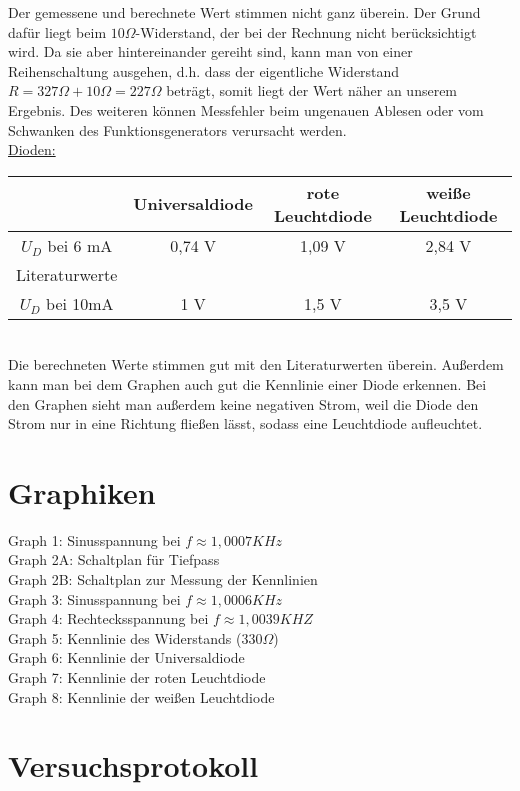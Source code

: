 \documentclass[paper=a4, fontsize=11pt]{scrartcl}
\numberwithin{equation}{section}
\numberwithin{figure}{section}
\numberwithin{table}{section}
\begin{document}
Der gemessene und berechnete Wert stimmen nicht ganz überein. Der Grund dafür liegt beim  $10 \Omega$-Widerstand, der bei der Rechnung nicht berücksichtigt wird. Da sie aber hintereinander gereiht sind, kann man von einer Reihenschaltung ausgehen, d.h. dass der eigentliche Widerstand $R=327 \Omega +10 \Omega = 227 \Omega$ beträgt, somit liegt der Wert näher an unserem Ergebnis. Des weiteren können Messfehler beim ungenauen Ablesen oder vom Schwanken des Funktionsgenerators verursacht werden. \\

\underline{Dioden:} \\

\begin{tabular}{|c|c|c|c|}
\hline
& Universaldiode & rote Leuchtdiode & weiße Leuchtdiode \\
\hline
$U_{D}$ bei 6 mA & 0,74 V& 1,09 V & 2,84 V \\
\hline
Literaturwerte & & & \\
$U_{D}$ bei 10mA & 1 V & 1,5 V & 3,5 V \\
\hline
\end{tabular} \\

Die berechneten Werte stimmen gut mit den Literaturwerten überein. Außerdem kann man bei dem Graphen auch gut die Kennlinie einer Diode erkennen.
Bei den Graphen sieht man außerdem keine negativen Strom, weil die Diode den Strom nur in eine Richtung fließen lässt, sodass eine Leuchtdiode aufleuchtet. 


\newpage

\section{Graphiken}

Graph 1: Sinusspannung bei $f \approx 1,0007 KHz$ \\
Graph 2A: Schaltplan für Tiefpass \\
Graph 2B: Schaltplan zur Messung der Kennlinien \\
Graph 3: Sinusspannung bei $f \approx 1,0006 KHz$ \\
Graph 4: Rechtecksspannung bei $f \approx 1,0039 KHZ$ \\
Graph 5: Kennlinie des Widerstands ($330 \Omega$) \\
Graph 6: Kennlinie der Universaldiode \\
Graph 7: Kennlinie der roten Leuchtdiode \\
Graph 8: Kennlinie der weißen Leuchtdiode \\


\newpage

\section{Versuchsprotokoll}
\end{document}
